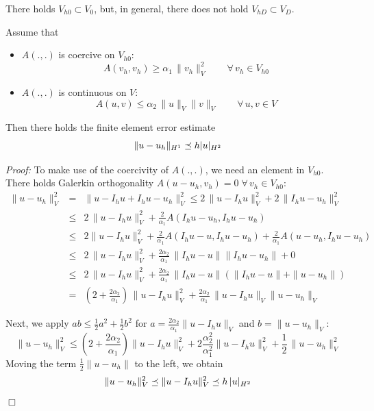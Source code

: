 There holds $V_{h0} \subset V_0$, but, in general, there does not hold $V_{hD} \subset V_D$.

\begin{theorem} Assume that 
\begin{itemize}
\item  $A(.,.)$ is coercive on $V_{h0}$:
$$
A(v_h, v_h) \geq \alpha_1 \, \| v_h \|_V^2 \qquad \forall \, v_h \in V_{h0}
$$
\item  $A(.,.)$ is continuous on $V$:
$$
A(u, v) \leq \alpha_2 \, \| u \|_V \| v \|_V \qquad \forall \, u, v \in V
$$
\end{itemize}
Then there holds the finite element error estimate
$$
\| u - u_h \|_{H^1} \preceq h | u |_{H^2}
$$
\end{theorem}
{\em Proof: } To make use of the coercivity of $A(.,.)$, we need an element in $V_{h0}$. There holds Galerkin orthogonality $A(u-u_h, v_h) = 0 \; \forall \, v_h \in V_{h0}$:
\begin{eqnarray*}
\| u - u_h \|_V^2 
        & = & \| u - I_h u + I_h u - u_h \|_V^2
          \leq 2 \, \| u - I_h u \|_V^2 + 2 \, \| I_h u - u_h \|_V^2 \\
        & \leq & 2 \, \| u - I_h u \|_V^2 + \frac{2}{\alpha_1} A(I_h u - u_h, I_h u - u_h) \\
        & \leq & 2 \| u - I_h u \|_V^2 + \frac{2}{\alpha_1} A(I_h u - u, I_h u - u_h) +  \frac{2}{\alpha_1}  A(u - u_h, I_h u - u_h) \\
        & \leq & 2 \, \| u - I_h u \|_V^2 + \frac{2 \alpha_2}{\alpha_1} \, \| I_h u - u \| \| I_h u - u_h \| + 0 \\
        & \leq & 2 \, \| u - I_h u \|_V^2 +  \frac{2 \alpha_2}{\alpha_1} \, \| I_h u - u \| ( \| I_h u - u \| + \| u - u_h \| ) \\
        & = & ( 2 + \frac{2 \alpha_2}{\alpha_1}) \, \| u - I_h u \|_V^2 +
         \frac{2 \alpha_2}{\alpha_1} \, \| u - I_h u \|_V \| u - u_h \|_V
\end{eqnarray*}

Next, we apply $a b \leq \frac{1}{2} a^2 +  \frac{1}{2} b^2$  for $a = \frac{2 \alpha_2}{\alpha_1} \| u - I_h u \|_V$ and $b = \| u - u_h \|_V$:
$$
\| u - u_h \|_V^2 \leq 
    ( 2 + \frac{2 \alpha_2}{\alpha_1}) \| u - I_h u \|_V^2 +
         2  \frac{\alpha_2^2}{\alpha_1^2}  \| u - I_h u \|_V^2 + \frac{1}{2} \, \| u - u_h \|_V^2
$$
Moving the term $\frac{1}{2} \| u - u_h \|$ to the left, we obtain
$$
\| u - u_h \|_V^2 \preceq \| u - I_h u \|_V^2 \preceq h \, | u |_{H^2}
$$
\hfill $\Box$

